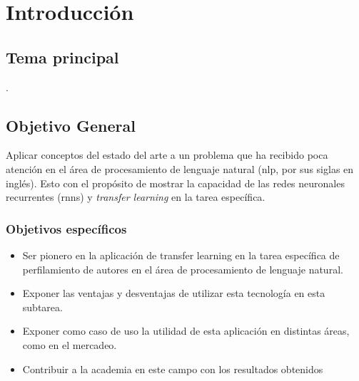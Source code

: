
\chapter{Introducción} %

\label{Chapter1} %


\newcommand{\keyword}[1]{\textbf{#1}}
\newcommand{\tabhead}[1]{\textbf{#1}}
\newcommand{\code}[1]{\texttt{#1}}
\newcommand{\file}[1]{\texttt{\bfseries#1}}
\newcommand{\option}[1]{\texttt{\itshape#1}}


\section{Tema principal}

\ttitle.



\section{Objetivo General}

Aplicar conceptos del estado del arte a un problema que ha recibido poca atención en el área de \gls{procesamiento de lenguaje natural} (\gls{nlp}, por sus siglas en inglés). Esto con el propósito de mostrar la capacidad de las redes neuronales recurrentes (\glspl{rnn}) y \textit{\gls{transfer learning}} en la tarea específica.

\subsection{Objetivos específicos}

\begin{itemize}
\item Ser pionero en la aplicación de transfer learning en la tarea específica de perfilamiento de autores en el área de procesamiento de lenguaje natural.
\item Exponer las ventajas y desventajas de utilizar esta tecnología en esta subtarea.
\item Exponer como caso de uso la utilidad de esta aplicación en distintas áreas, como en el mercadeo.
\item Contribuir a la academia en este campo con los resultados obtenidos
\end{itemize}

